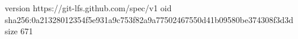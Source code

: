 version https://git-lfs.github.com/spec/v1
oid sha256:0a21328012354f5e931a9c753f82a9a77502467550d41b09580be374308f3d3d
size 671
